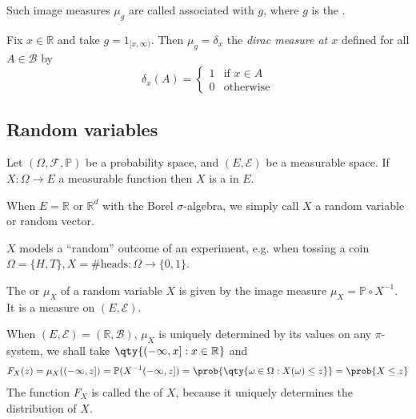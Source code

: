 \begin{remark}
	Such image measures $\mu_g$ are called  associated with $g$, where $g$ is the .
\end{remark}

\begin{example}
	Fix $x \in \mathbb{R}$ and take $g = 1_{[x,\infty)}$.
	Then $\mu_g = \delta_x$ the \emph{dirac measure at $x$} defined for all $A \in \mathcal{B}$ by
	\[ \delta_x(A) = \begin{cases}
		1 & \text{if } x \in A \\
		0 & \text{otherwise}
	\end{cases} \]
\end{example}

\subsection{Random variables}

\begin{definition}
	Let $(\Omega, \mathcal F, \mathbb P)$ be a probability space, and $(E, \mathcal E)$ be a measurable space.
	If $X : \Omega \to E$ a measurable function then $X$ is a  in $E$.
\end{definition}
When $E = \mathbb R$ or $\mathbb R^d$ with the Borel $\sigma$-algebra, we simply call $X$ a random variable or random vector.

\begin{example}
	$X$ models a ``random'' outcome of an experiment, e.g. when tossing a coin $\Omega = \{H, T\}, X = \text{\# heads} : \Omega \to \{0, 1\}$.
\end{example}

\begin{definition}[Distribution]
	The  or  $\mu_X$ of a random variable $X$ is given by the image measure $\mu_X = \mathbb P \circ X^{-1}$.
	It is a measure on $(E, \mathcal{E})$.

	When $(E, \mathcal{E}) = (\mathbb{R}, \mathcal{B})$, $\mu_X$ is uniquely determined by its values on any $\pi$-system, we shall take $\qty{(-\infty, x] : x \in \mathbb{R}}$ and
	\begin{align*}
		F_X(z) = \mu_X((-\infty, z]) = \mathbb P(X^{-1}(-\infty,z]) = \prob{\qty{\omega \in \Omega : X(\omega) \leq z}} = \prob{X \leq z}
	\end{align*}
	The function $F_X$ is called the  of $X$, because it uniquely determines the distribution of $X$.
\end{definition}

